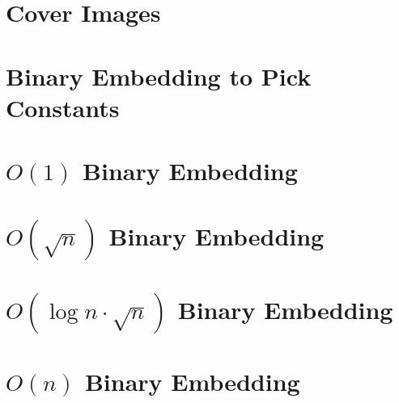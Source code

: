 \documentclass[11pt,a4paper]{report}
\begin{document}
\section{Cover Images}


\newpage
\section{Binary Embedding to Pick Constants}


\newpage
\section{\texorpdfstring{$O(1)$}{O(1)} Binary Embedding}


\newpage
\section{\texorpdfstring{$O(\sqrt{n})$}{O(sqrt(n))} Binary Embedding}


\newpage
\section{\texorpdfstring{$O(\log{n} \cdot \sqrt{n})$}{O(log(n)*sqrt(n))} Binary Embedding}


\newpage
\section{\texorpdfstring{$O(n)$}{O(n)} Binary Embedding}

\end{document}
